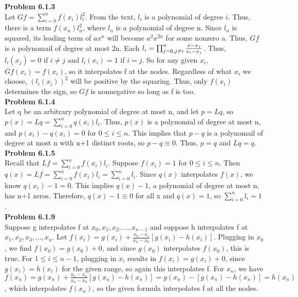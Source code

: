 \documentclass{article}
\newcommand{\Problem}[1]{\textbf{Problem #1}}
\begin{document}
\Problem{6.1.3}\\

Let $Gf = \sum_{i = 0}^n f(x_i)l_i^2$.
From the text, $l_i$ is a polynomial of degree $i$. 
Thus, there is a term $f(x_n)l_n^2$, where $l_n$ is a polynomial of degree n.
Since $l_n$ is squared, its leading term of $ax^n$ will become $a^2x^{2n}$ for some nonzero a. 
Thus, $Gf$ is a polynomail of degree at most 2n.
Each $l_i = \prod_{\substack j = 0, \\ j \neq i}^n \frac{x-x_j}{x_i-x_j}$.
Thus, $l_i(x_j) = 0$ if $i \neq j$ and $l_i(x_i) = 1$ if $i = j$. 
So for any given $x_i$, $Gf(x_i) = f(x_i)$, so it interpolates f at the nodes.
Regardless of what $x_i$ we choose, $(l_i(x_i))^2$ will be positive by the squaring.
Thus, only $f(x_i)$ determines the sign, so $Gf$ is nonnegative so long as f is too.\\

\Problem{6.1.4}\\

Let q be an arbitrary polynomial of degree at most n, and let $p = Lq$, so $p(x) = Lq = \sum_{i = 0}^n q(x_i)l_i$.
Thus, $p(x)$ is a polynomial of degree at most n, and $p(x_i) - q(x_i) = 0$ for $0 \leq i \leq n$.
This implies that $p - q$ is a polynomail of degree at most n with n+1 distinct roots, so $p - q \equiv 0$.
Thus, $p = q$ and $Lq = q$.\\

\Problem{6.1.5}\\

Recall that $Lf = \sum_{i = 0}^n f(x_i)l_i$.
Suppose $f(x_i) = 1$ for $0 \leq i \leq n$. 
Then $q(x) = Lf = \sum_{i = 0}^n f(x_i)l_i = \sum_{i = 0}^n l_i$. 
Since $q(x)$ interpolates $f(x)$, we know $q(x_i) - 1 = 0$. 
This implies $q(x) - 1$, a polynomial of degree at most n, has n+1 zeros.
Therefore, $q(x) - 1 \equiv 0$ for all x and $q(x) = 1$, so $\sum_{i = 0}^n l_i = 1$.\\

\Problem{6.1.9}\\

Suppose g interpolates f at $x_0,x_1,x_2,...,x_{n-1}$ and suppose h interpolates f at $x_1,x_2,x_3,...,x_n$.
Let $f(x_i) = g(x_i) + \frac{x_0 - x_i}{x_n-x_0}[g(x_i) - h(x_i)]$.
Plugging in $x_0$, we find $f(x_0) = g(x_0) + 0$, and since $g(x_0)$ interpolates $f(x_0)$, this is true.
For $1 \leq i \leq n-1$, plugging in $x_i$ results in $f(x_i) = g(x_i) + 0$, since $g(x_i) = h(x_i)$ for the given range, so again this interpolates f.
For $x_n$, we have $f(x_n) = g(x_n) + \frac{x_0 - x_n}{x_n - x_0}[g(x_n) - h(x_n)] = g(x_n) - [g(x_n) - h(x_n)] = h(x_n)$, which interpolates $f(x_n)$, so the given formula interpolates f at all the nodes.\\
\end{document}
